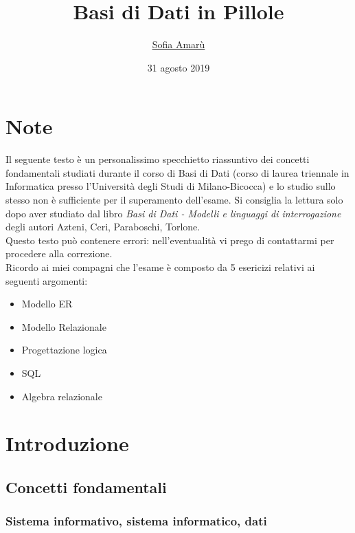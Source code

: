 \documentclass[a4paper]{article}
\begin{document}
\title{Basi di Dati in Pillole}
\date{31 agosto 2019}
\author{\href{https://t.me/amarusofia}{Sofia Amarù}}
\maketitle
\tableofcontents

\section*{Note}
Il seguente testo è un personalissimo specchietto riassuntivo dei concetti fondamentali studiati durante il corso di Basi di Dati (corso di laurea triennale in Informatica presso l'Università degli Studi di Milano-Bicocca) e lo studio sullo stesso non è sufficiente per il superamento dell'esame. Si consiglia la lettura solo dopo aver studiato dal libro \emph{Basi di Dati - Modelli e linguaggi di interrogazione} degli autori Azteni, Ceri, Paraboschi, Torlone.\medskip\\
Questo testo può contenere errori: nell'eventualità vi prego di contattarmi per procedere alla correzione.\medskip\\
%
Ricordo ai miei compagni che l'esame è composto da 5 esericizi relativi ai seguenti argomenti:
\begin{itemize}[leftmargin=*, noitemsep]
  \item Modello ER
  \item Modello Relazionale
  \item Progettazione logica
  \item SQL
  \item Algebra relazionale
\end{itemize}

\section{Introduzione}
\subsection{Concetti fondamentali}
\subsubsection{Sistema informativo, sistema informatico, dati}
\end{document}
